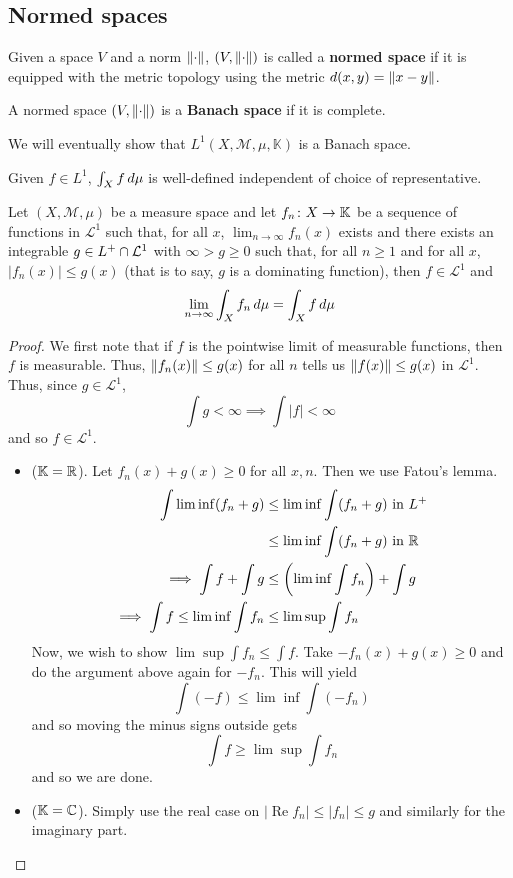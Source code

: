 \documentclass[11pt,leqno,oneside]{amsbook}
\numberwithin{thm}{section}
\newcommand{\M}{\mathcal{M}} %
\newcommand{\cL}{\mathcal{L}}
\newcommand{\K}{\mathbb{K}} %
\renewcommand{\de}{\textbf} %
\begin{document}
\subsection{Normed spaces}
\begin{defn}
  Given a space \(V\) and a norm \(\norm\),  \((V,\norm)\) is called a
  \de{normed space} if it is equipped with the metric topology using
  the metric \(d(x,y) = \norm[x-y]\).
\end{defn}
\begin{defn}
  A normed space \((V,\norm)\) is a \de{Banach space} if it is
  complete.
\end{defn}
We will eventually show that \(L^1(X,\M,\mu,\mathbb{K})\) is a Banach
space.
\begin{rmk}
  Given \(f \in L^1\), \(\int_X f \d\mu\) is well-defined independent
  of choice of representative.
\end{rmk}
\begin{thm}\label{dct-v1}
  Let \((X,\M,\mu)\) be a measure space and let \(f_n \from X \to
  \mathbb{K}\) be a sequence of functions in \(\cL^1\) such that, for
  all \(x\), \(\lim_{n \to \infty} f_n(x)\) exists and there exists an
  integrable \(g \in L^+ \intersect \cL^1\) with \(\infty > g \geq
  0\) such that, for all \(n \geq 1\) and for all \(x\), \(|f_n(x)|
  \leq g(x)\) (that is to say, \(g\) is a dominating function), then
  \(f \in \cL^1\) and \[
    \lim_{n \to \infty} \int_X f_n \d\mu = \int_X f \d\mu
  \]
\end{thm}
\begin{proof}
  We first note that if \(f\) is the pointwise limit of measurable
  functions, then \(f\) is measurable. Thus, \(\norm[f_n(x)] \leq
  g(x)\) for all \(n\) tells us \(\norm[f(x)] \leq g(x)\) in
  \(\cL^1\). Thus, since \(g \in \cL^1\), \[
    \int g < \infty \implies \int |f| < \infty
  \]
  and so \(f \in \cL^1\).
  \begin{itemize}
  \item (\(\K = \R\)). Let \(f_n(x) + g(x) \geq 0\) for all
    \(x,n\). Then we use Fatou's lemma.
    \begin{align*}
      \int \lim \inf (f_n+g)
      & \leq \lim \inf \int (f_n+g) \text{ in }L^+ \\
      & \leq \lim \inf \int (f_n+g) \text{ in }\R \\
      \implies \int f + \int g & \leq \left( \lim \inf \int f_n \right)
      + \int g \\
      \implies \int f \leq \lim \inf \int f_n & \leq \lim \sup \int f_n
    \end{align*}
    Now, we wish to show \(\lim \sup \int f_n \leq \int f\). Take
    \(-f_n(x) + g(x) \geq 0\) and do the argument above again for
    \(-f_n\). This will yield \[
      \int (-f) \leq \lim \inf \int (-f_n)
    \]
    and so moving the minus signs outside gets \[
      \int f \geq \lim \sup \int f_n
    \]
    and so we are done.
  \item (\(\K = \C\)). Simply use the real case on \(|\operatorname{Re}
   f_n| \leq |f_n| \leq g\) and similarly for the imaginary part.
  \end{itemize}
\end{proof}
\end{document}
